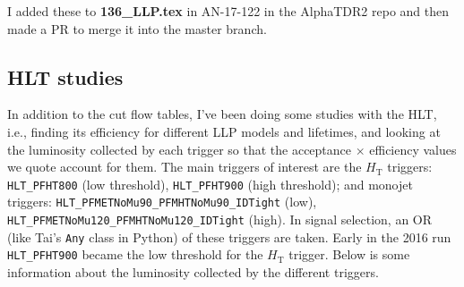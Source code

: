 I added these to \textbf{136\_LLP.tex} in AN-17-122 in the AlphaTDR2 repo and then made a PR to merge it into the master branch.


\subsection{HLT studies}

In addition to the cut flow tables, I've been doing some studies with the HLT, i.e., finding its efficiency for different LLP models and lifetimes, and looking at the luminosity collected by each trigger so that the acceptance $\times$ efficiency values we quote account for them. The main triggers of interest are the $H_{\mathrm{T}}$ triggers: \texttt{HLT\_PFHT800} (low threshold), \texttt{HLT\_PFHT900} (high threshold); and monojet triggers: \texttt{HLT\_PFMETNoMu90\_PFMHTNoMu90\_IDTight} (low),  \texttt{HLT\_PFMETNoMu120\_PFMHTNoMu120\_IDTight} (high). In signal selection, an OR (like Tai's \texttt{Any} class in Python) of these triggers are taken. Early in the 2016 run \texttt{HLT\_PFHT900} became the low threshold for the $H_{\mathrm{T}}$ trigger. Below is some information about the luminosity collected by the different triggers.

\begin{table}[H]
\caption{The luminosity collected by each HLT, or combination of Triggers, from the entire 2016 run. Over the course of the run, the threshold for the lowest unprescaled trigger in each category rose. The fraction of luminosity collected by each Trigger whilst it was lowest threshold is included.}
\end{table}


